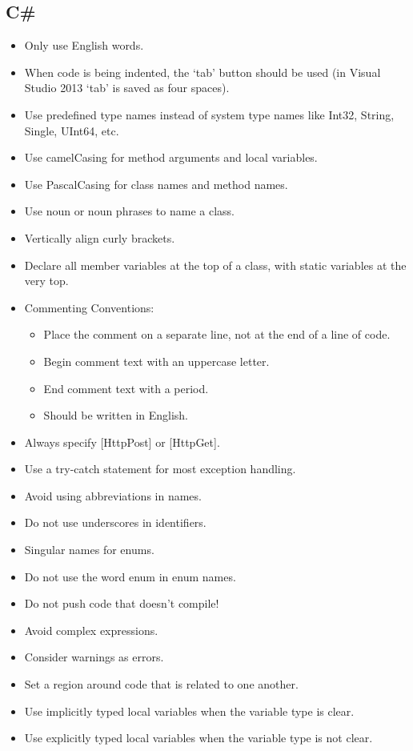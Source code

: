 \documentclass[paper=a4, fontsize=11pt]{scrartcl} %
\numberwithin{equation}{section} %
\numberwithin{figure}{section} %
\numberwithin{table}{section} %
\begin{document}
  \subsection{C\#}
  \begin{itemize}
    \item Only use English words.
    \item When code is being indented, the `tab' button should be used (in Visual Studio 2013 `tab' is saved as four spaces).
    \item Use predefined type names instead of system type names like Int32, String, Single, UInt64, etc.
    \item Use camelCasing for method arguments and local variables.
    \item Use PascalCasing for class names and method names.
    \item Use noun or noun phrases to name a class.
    \item Vertically align curly brackets.
    \item Declare all member variables at the top of a class, with static variables at the very top.
    \item Commenting Conventions:
    \begin{itemize}
    \item Place the comment on a separate line, not at the end of a line of code.
    \item Begin comment text with an uppercase letter.
    \item End comment text with a period.
    \item Should be written in English.
    \end{itemize}
    \item Always specify [HttpPost] or [HttpGet].
    \item Use a try-catch statement for most exception handling.
    \item Avoid using abbreviations in names.
    \item Do not use underscores in identifiers.
    \item Singular names for enums.
    \item Do not use the word enum in enum names.
    \item Do not push code that doesn’t compile!
    \item Avoid complex expressions.
    \item Consider warnings as errors.
    \item Set a region around code that is related to one another.
    \item Use implicitly typed local variables when the variable type is clear.
    \item Use explicitly typed local variables when the variable type is not clear.
  \end{itemize}
  
\end{document}
